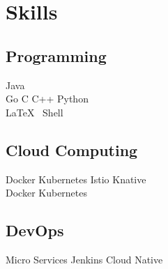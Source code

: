 \documentclass[]{deedy-resume-openfont}
\begin{document}
\begin{minipage}[t]{0.25\textwidth}


\section{Skills}
\sectionsep
\subsection{Programming}
Java   \\
Go \textbullet{} C \textbullet{} C++ \textbullet{}  Python    \\
\LaTeX\ \textbullet{}  Shell  \\ 
\sectionsep

\subsection{Cloud Computing}
Docker \textbullet{} Kubernetes \textbullet{} Istio \textbullet{} Knative \\
Docker \textbullet{} Kubernetes  \\
\sectionsep

\subsection{DevOps}
Micro Services \textbullet{} Jenkins \textbullet{} Cloud Native

%
%

\end{minipage} 
\hfill
\end{document}
